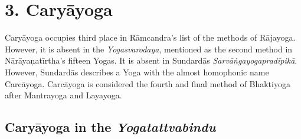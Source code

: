 
\section{3. Caryāyoga}
\label{caryayogaintro}

Caryāyoga occupies third place in Rāmcandra's list of the methods of Rājayoga. However, it is absent in the \textit{Yogasvarodaya}, mentioned as the second method in Nārāyaṇatīrtha's fifteen Yogas. It is absent in Sundardās \textit{Sarvāṅgayogapradīpikā}. However, Sundardās describes a Yoga with the almost homophonic name Carcāyoga. Carcāyoga is considered the fourth and final method of Bhaktiyoga after Mantrayoga and Layayoga. 

\subsection{Caryāyoga in the \textit{Yogatattvabindu}}

